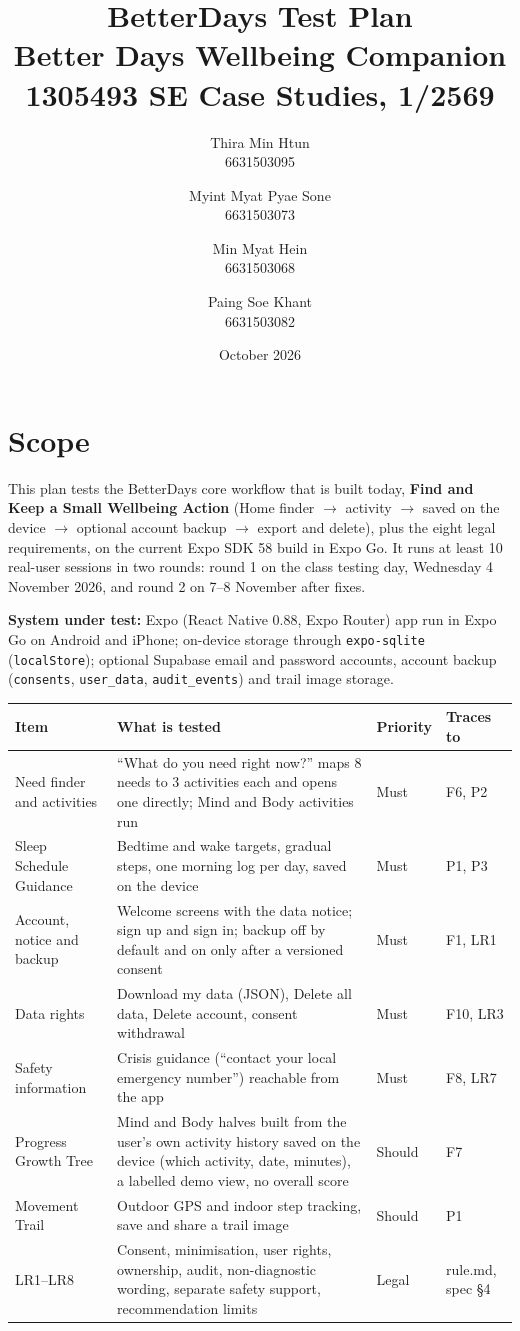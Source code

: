 \documentclass{article}
\title{BetterDays Test Plan\\ \large Better Days Wellbeing Companion \\ 1305493 SE Case Studies, 1/2569}
\author{
  Thira Min Htun \\ 6631503095
  \and Myint Myat Pyae Sone \\ 6631503073
  \and Min Myat Hein \\ 6631503068
  \and Paing Soe Khant \\ 6631503082
}
\date{October 2026}
\begin{document}
\maketitle

\section{Scope}

This plan tests the BetterDays core workflow that is built today, \textbf{Find and Keep a Small Wellbeing Action} (Home finder $\rightarrow$ activity $\rightarrow$ saved on the device $\rightarrow$ optional account backup $\rightarrow$ export and delete), plus the eight legal requirements, on the current Expo SDK 58 build in Expo Go. It runs at least 10 real-user sessions in two rounds: round 1 on the class testing day, Wednesday 4 November 2026, and round 2 on 7--8 November after fixes.

\textbf{System under test:} Expo (React Native 0.88, Expo Router) app run in Expo Go on Android and iPhone; on-device storage through \texttt{expo-sqlite} (\texttt{localStore}); optional Supabase email and password accounts, account backup (\texttt{consents}, \texttt{user\_data}, \texttt{audit\_events}) and trail image storage.

\begin{center}
\small
\begin{tabularx}{\linewidth}{|L{2.6cm}|Y|L{1.4cm}|L{2.4cm}|}
\hline
\textbf{Item} & \textbf{What is tested} & \textbf{Priority} & \textbf{Traces to} \\ \hline
Need finder and activities & ``What do you need right now?'' maps 8 needs to 3 activities each and opens one directly; Mind and Body activities run & Must & F6, P2 \\ \hline
Sleep Schedule Guidance & Bedtime and wake targets, gradual steps, one morning log per day, saved on the device & Must & P1, P3 \\ \hline
Account, notice and backup & Welcome screens with the data notice; sign up and sign in; backup off by default and on only after a versioned consent & Must & F1, LR1 \\ \hline
Data rights & Download my data (JSON), Delete all data, Delete account, consent withdrawal & Must & F10, LR3 \\ \hline
Safety information & Crisis guidance (``contact your local emergency number'') reachable from the app & Must & F8, LR7 \\ \hline
Progress Growth Tree & Mind and Body halves built from the user's own activity history saved on the device (which activity, date, minutes), a labelled demo view, no overall score & Should & F7 \\ \hline
Movement Trail & Outdoor GPS and indoor step tracking, save and share a trail image & Should & P1 \\ \hline
LR1--LR8 & Consent, minimisation, user rights, ownership, audit, non-diagnostic wording, separate safety support, recommendation limits & Legal & rule.md, spec \S4 \\ \hline
\end{tabularx}
\end{center}
\end{document}
